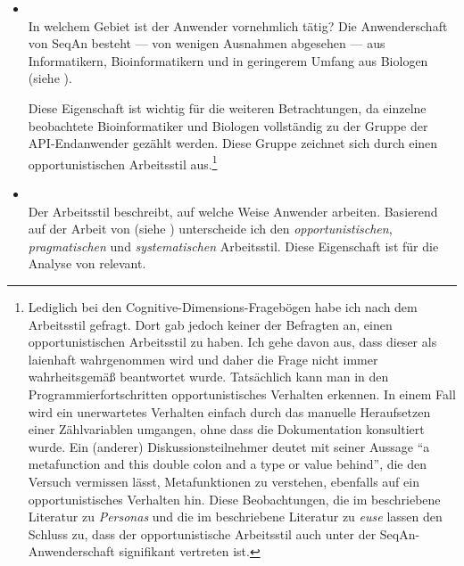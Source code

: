 \begin{itemize}
  \item[\codebullet{apiua://code/-9223372036854775596}] \textbf{} \\
  In welchem Gebiet ist der Anwender vornehmlich tätig? Die Anwenderschaft von SeqAn besteht --- von wenigen Ausnahmen abgesehen --- aus Informatikern, Bioinformatikern und in geringerem Umfang aus Biologen (siehe ).
  
  Diese Eigenschaft ist wichtig für die weiteren Betrachtungen, da einzelne beobachtete Bioinformatiker und Biologen vollständig zu der Gruppe der API-Endanwender gezählt werden. Diese Gruppe zeichnet sich durch einen opportunistischen Arbeitsstil aus.\footnote{Lediglich bei den Cognitive-Dimensions-Fragebögen habe ich nach dem Arbeitsstil gefragt. Dort gab jedoch keiner der Befragten an, einen opportunistischen Arbeitsstil zu haben. Ich gehe davon aus, dass dieser als laienhaft wahrgenommen wird und daher die Frage nicht immer wahrheitsgemäß beantwortet wurde. Tatsächlich kann man in den Programmierfortschritten opportunistisches Verhalten erkennen. In einem Fall wird ein unerwartetes Verhalten einfach durch das manuelle Heraufsetzen einer Zählvariablen umgangen, ohne dass die Dokumentation konsultiert wurde. Ein (anderer) Diskussionsteilnehmer deutet mit seiner Aussage ``a metafunction and this double colon and a type or value behind'', die den Versuch vermissen lässt, Metafunktionen zu verstehen, ebenfalls auf ein opportunistisches Verhalten hin. Diese Beobachtungen, die im  beschriebene Literatur zu \textit{Personas} \citep{clarke:DSP:2007:1080} und die im  beschriebene Literatur zu \textit{\acrlong{euse}} \citep{Ko:2011el} lassen den Schluss zu, dass der opportunistische Arbeitsstil auch unter der SeqAn-Anwenderschaft signifikant vertreten ist.}
  
  \item[\codebullet{apiua://code/-9223372036854775600}] \textbf{} \\
  Der Arbeitsstil beschreibt, auf welche Weise Anwender arbeiten. Basierend auf der Arbeit von \cite{clarke:DSP:2007:1080} (siehe ) unterscheide ich den \textit{opportunistischen}, \textit{pragmatischen} und \textit{systematischen} Arbeitsstil. Diese Eigenschaft ist für die Analyse von  relevant.
  

\end{itemize}

